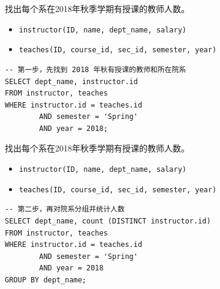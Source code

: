 \documentclass[aspectratio=169, 14pt]{beamer}
\begin{document}
\begin{frame}[fragile]

	找出每个系在2018年秋季学期有授课的教师人数。

	\begin{itemize}
		\item \texttt{instructor(ID, name, dept\_name, salary)}
		\item \texttt{teaches(ID, course\_id, sec\_id, semester, year)}
	\end{itemize}



	\begin{verbatim}
-- 第一步，先找到 2018 年秋有授课的教师和所在院系
SELECT dept_name, instructor.id
FROM instructor, teaches
WHERE instructor.id = teaches.id 
        AND semester = 'Spring' 
        AND year = 2018;
\end{verbatim}


\end{frame}

\begin{frame}[fragile]
	找出每个系在2018年秋季学期有授课的教师人数。

	\begin{itemize}
		\item \texttt{instructor(ID, name, dept\_name, salary)}
		\item \texttt{teaches(ID, course\_id, sec\_id, semester, year)}
	\end{itemize}


	\begin{verbatim}
-- 第二步，再对院系分组并统计人数
SELECT dept_name, count (DISTINCT instructor.id)
FROM instructor, teaches
WHERE instructor.id = teaches.id 
        AND semester = 'Spring' 
        AND year = 2018
GROUP BY dept_name;
    \end{verbatim}
\end{frame}
\end{document}
